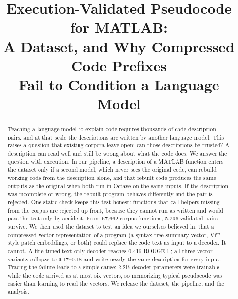 \documentclass[conference]{IEEEtran}
\newcommand{\FunnelTotal}{67{,}662}        %
\newcommand{\NAccepted}{5{,}296}           %
\begin{document}
\title{Execution-Validated Pseudocode for MATLAB:\\
A Dataset, and Why Compressed Code Prefixes\\
Fail to Condition a Language Model}

\author{
\and
{}
}

\maketitle

\begin{abstract}
Teaching a language model to explain code requires thousands of code-description pairs, and at that scale the descriptions are written by another language model. This raises a question that existing corpora leave open: can those descriptions be trusted? A description can read well and still be wrong about what the code does. We answer the question with execution. In our pipeline, a description of a MATLAB function enters the dataset only if a second model, which never sees the original code, can rebuild working code from the description alone, and that rebuilt code produces the same outputs as the original when both run in Octave on the same inputs. If the description was incomplete or wrong, the rebuilt program behaves differently and the pair is rejected. One static check keeps this test honest: functions that call helpers missing from the corpus are rejected up front, because they cannot run as written and would pass the test only by accident. From \FunnelTotal{} corpus functions, \NAccepted{} validated pairs survive. We then used the dataset to test an idea we ourselves believed in: that a compressed vector representation of a program (a syntax-tree summary vector, ViT-style patch embeddings, or both) could replace the code text as input to a decoder. It cannot. A fine-tuned text-only decoder reaches 0.416 ROUGE-L; all three vector variants collapse to 0.17--0.18 and write nearly the same description for every input. Tracing the failure leads to a simple cause: 2.2B decoder parameters were trainable while the code arrived as at most six vectors, so memorizing typical pseudocode was easier than learning to read the vectors. We release the dataset, the pipeline, and the analysis.
\end{abstract}
\end{document}
